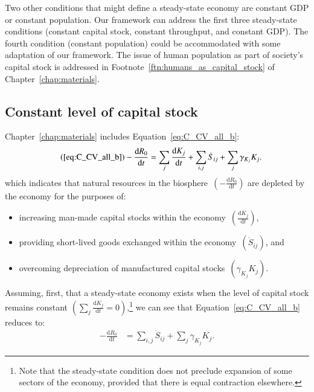 Two other conditions that might define a steady-state
economy are constant GDP or constant population.
Our framework can address the first three steady-state conditions
(constant capital stock, constant throughput, and constant GDP).
The fourth condition (constant population) could be
accommodated with some adaptation of our
framework. 
The issue of human population as part of society's
capital stock is addressed in Footnote~\ref{ftn:humans_as_capital_stock}
of Chapter~\ref{chap:materials}.


\subsection{Constant level of capital stock}

Chapter~\ref{chap:materials}
includes Equation~\ref{eq:C_CV_all_b}:
%
\begin{align}\tag{\ref{eq:C_CV_all_b}}
	- \frac{\mathrm{d}R_{0}}{\mathrm{d}t}										&
	=\sum_{j}\frac{\mathrm{d}K_{j}}{\mathrm{d}t}
	+ \sum_{i,j}\dot{S}_{ij}
	+ \sum_{j}\gamma_{K_{j}}K_{j}.
\end{align}
%
which indicates that 
natural resources in the 
biosphere~$\left(- \frac{\mathrm{d}R_{0}}{\mathrm{d}t}\right)$
are depleted by the economy
for the purposes of:

\begin{itemize}
	\item{increasing man-made capital stocks
	within the economy~$\left(\frac{\mathrm{d}K_{j}}{\mathrm{d}t}\right)$,}
	\item{providing short-lived goods exchanged within the
	economy~$\left(\dot{S}_{ij}\right)$, and}
	\item{overcoming depreciation of manufactured
	capital stocks~$\left(\gamma_{K_{j}}K_{j}\right)$.}
\end{itemize}

Assuming,
first,
that a steady-state economy exists when the level
of capital stock remains constant
$\left(\sum_{j}\frac{\mathrm{d}K_{j}}{\mathrm{d}t}=0\right)$,\footnote{Note
that the steady-state condition does not preclude expansion
of some sectors of the economy, provided that there is 
equal contraction elsewhere.}
we can see that Equation~\ref{eq:C_CV_all_b}
reduces to:
%
\begin{align}\label{eq:C_CV_all_c}
	- \frac{\mathrm{d}R_{0}}{\mathrm{d}t}										&
	= \sum_{i,j}\dot{S}_{ij}
	+ \sum_{j}\gamma_{K_{j}}K_{j}.
\end{align}

